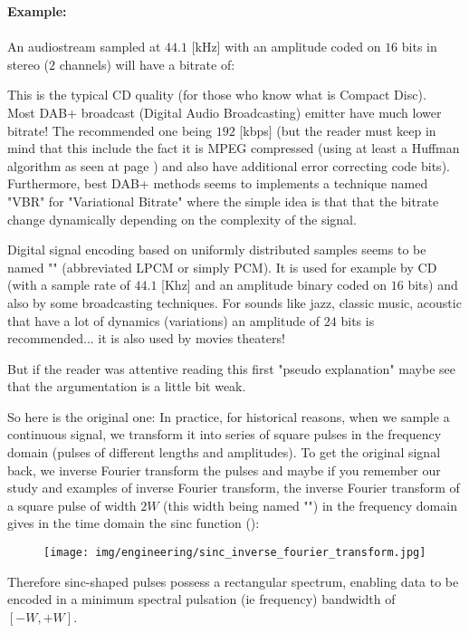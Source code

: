 	\begin{tcolorbox}[colframe=black,colback=white,sharp corners]
	\textbf{{\Large {}}Example:}\\\\
	An audiostream sampled at $44.1$ [kHz] with an amplitude coded on $16$ bits in stereo ($2$ channels) will have a bitrate of:
	
	This is the typical CD quality (for those who know what is Compact Disc).\\
	
	Most DAB+ broadcast (Digital Audio Broadcasting) emitter have much lower bitrate! The recommended one being $192$ [kbps] (but the reader must keep in mind that this include the fact it is MPEG compressed (using at least a Huffman algorithm as seen at page \pageref{huffman algorithm}) and also have additional error correcting code bits). Furthermore, best DAB+ methods seems to implements a technique named "VBR" for "Variational Bitrate" where the simple idea is that that the bitrate change dynamically depending on the complexity of the signal.
	\end{tcolorbox}
	\begin{tcolorbox}[title=Remark,colframe=black,arc=10pt]
	Digital signal encoding based on uniformly distributed samples seems to be named "" (abbreviated LPCM or simply PCM). It is used for example by CD (with a sample rate of $44.1$ [Khz] and an amplitude binary coded on $16$ bits) and also by some broadcasting techniques. For sounds like jazz, classic music, acoustic that have a lot of dynamics (variations) an amplitude of $24$ bits is recommended... it is also used by movies theaters! 
	\end{tcolorbox}
	But if the reader was attentive reading this first "pseudo explanation" maybe see that the argumentation is a little bit weak.
	
	So here is the original one: In practice, for historical reasons, when we sample a continuous signal, we transform it into series of square pulses in the frequency domain (pulses of different lengths and amplitudes). To get the original signal back, we inverse Fourier transform the pulses and maybe if you remember our study and examples of inverse Fourier transform, the inverse Fourier transform of a square pulse of width $2W$ (this width being named "") in the frequency domain gives in the time domain the sinc function ():
	\begin{figure}[H]
		\centering
		\texttt{[image: img/engineering/sinc\_inverse\_fourier\_transform.jpg]}
	\end{figure}
	Therefore sinc-shaped pulses possess a rectangular spectrum, enabling data to be encoded in a minimum spectral pulsation (ie frequency) bandwidth of $[-W,+W]$.
	
